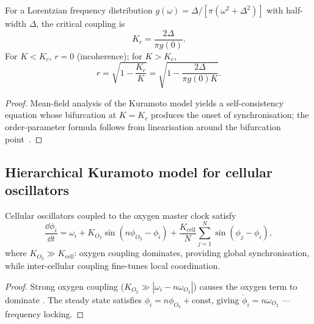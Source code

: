 \begin{theorem}
\label{thm:ch07-critical-coupling}
For a Lorentzian frequency distribution $g(\omega) = \Delta/[\pi(\omega^2+\Delta^2)]$
with half-width $\Delta$, the critical coupling is
\begin{equation}
  K_c = \frac{2\Delta}{\pi g(0)}.
  \label{eq:ch07-critical-coupling}
\end{equation}
For $K < K_c$, $r = 0$ (incoherence); for $K > K_c$,
\begin{equation}
  r = \sqrt{1 - \frac{K_c}{K}} = \sqrt{1 - \frac{2\Delta}{\pi g(0) K}}.
  \label{eq:ch07-order-parameter-formula}
\end{equation}
\end{theorem}

\begin{proof}
Mean-field analysis of the Kuramoto model yields a self-consistency equation
whose bifurcation at $K = K_c$ produces the onset of synchronisation; the
order-parameter formula follows from linearisation around the bifurcation
point~\citep{Kuramoto1984,Strogatz2000}.
\end{proof}

\subsection{Hierarchical Kuramoto model for cellular oscillators}

\begin{theorem}
\label{thm:ch07-hierarchical-kuramoto}
Cellular oscillators coupled to the oxygen master clock satisfy
\begin{equation}
  \frac{\dd\phi_i}{\dd t}
  = \omega_i
    + K_{O_2}\sin(n\phi_{O_2} - \phi_i)
    + \frac{K_{\mathrm{cell}}}{N}\sum_{j=1}^{N}\sin(\phi_j - \phi_i),
  \label{eq:ch07-hierarchical-kuramoto}
\end{equation}
where $K_{O_2} \gg K_{\mathrm{cell}}$: oxygen coupling dominates, providing
global synchronisation, while inter-cellular coupling fine-tunes local
coordination.
\end{theorem}

\begin{proof}
Strong oxygen coupling ($K_{O_2} \gg |\omega_i - n\omega_{O_2}|$) causes
the oxygen term to dominate .  The
steady state satisfies $\phi_i = n\phi_{O_2} + \mathrm{const}$, giving
$\dot{\phi}_i = n\omega_{O_2}$ — frequency locking.
\end{proof}

